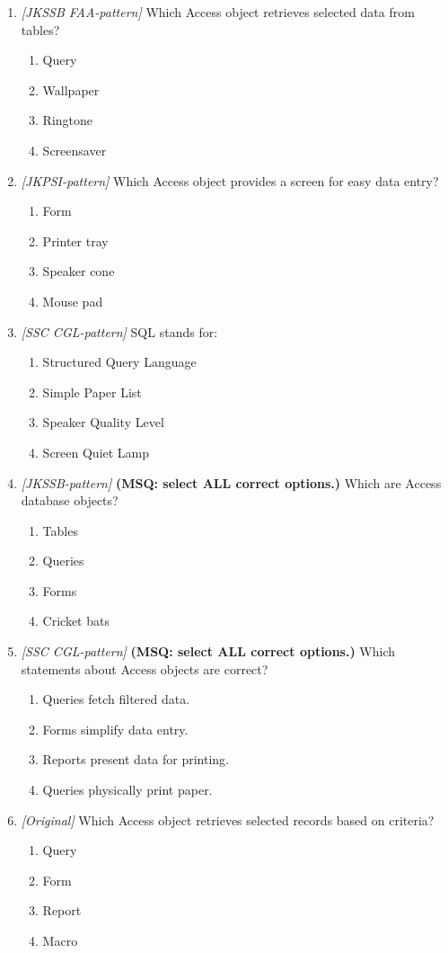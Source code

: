 \begin{enumerate}[label=\textbf{Q\arabic*.}, leftmargin=*]
\item \textit{[JKSSB FAA-pattern]} Which Access object retrieves selected data from tables?
  \begin{enumerate}[label=\Alph*.]
    \item Query
    \item Wallpaper
    \item Ringtone
    \item Screensaver
  \end{enumerate}
\item \textit{[JKPSI-pattern]} Which Access object provides a screen for easy data entry?
  \begin{enumerate}[label=\Alph*.]
    \item Form
    \item Printer tray
    \item Speaker cone
    \item Mouse pad
  \end{enumerate}
\item \textit{[SSC CGL-pattern]} SQL stands for:
  \begin{enumerate}[label=\Alph*.]
    \item Structured Query Language
    \item Simple Paper List
    \item Speaker Quality Level
    \item Screen Quiet Lamp
  \end{enumerate}
\item \textit{[JKSSB-pattern]} \textbf{(MSQ: select ALL correct options.)} Which are Access database objects?
  \begin{enumerate}[label=\Alph*.]
    \item Tables
    \item Queries
    \item Forms
    \item Cricket bats
  \end{enumerate}
\item \textit{[SSC CGL-pattern]} \textbf{(MSQ: select ALL correct options.)} Which statements about Access objects are correct?
  \begin{enumerate}[label=\Alph*.]
    \item Queries fetch filtered data.
    \item Forms simplify data entry.
    \item Reports present data for printing.
    \item Queries physically print paper.
  \end{enumerate}
\item \textit{[Original]} Which Access object retrieves selected records based on criteria?
  \begin{enumerate}[label=\Alph*.]
\item Query
   \item Form
   \item Report
   \item Macro
  \end{enumerate}


\end{enumerate}
